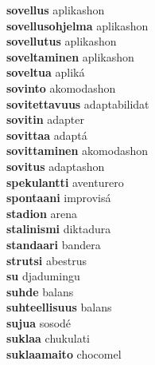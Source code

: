 \textbf{sovellus } aplikashon \\
\textbf{sovellusohjelma } aplikashon \\
\textbf{sovellutus } aplikashon \\
\textbf{soveltaminen } aplikashon \\
\textbf{soveltua } apliká \\
\textbf{sovinto } akomodashon \\
\textbf{sovitettavuus } adaptabilidat \\
\textbf{sovitin } adapter \\
\textbf{sovittaa } adaptá \\
\textbf{sovittaminen } akomodashon \\
\textbf{sovitus } adaptashon \\
\textbf{spekulantti } aventurero \\
\textbf{spontaani } improvisá \\
\textbf{stadion } arena \\
\textbf{stalinismi } diktadura \\
\textbf{standaari } bandera \\
\textbf{strutsi } abestrus \\
\textbf{su } djadumingu \\
\textbf{suhde } balans \\
\textbf{suhteellisuus } balans \\
\textbf{sujua } sosodé \\
\textbf{suklaa } chukulati \\
\textbf{suklaamaito } chocomel \\
